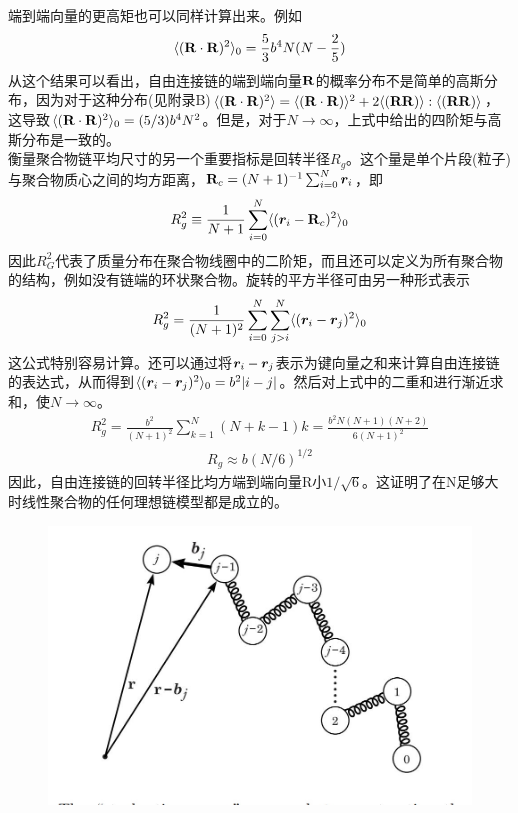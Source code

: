端到端向量的更高矩也可以同样计算出来。例如\\
\begin{gather}
\langle (\mathbf{R} \cdot \mathbf{R})^2 \rangle_{0}=\frac{5}{3}b^4N(N-\frac{2}{5})
\label{2.13}
\end{gather}
从这个结果可以看出，自由连接链的端到端向量$\mathbf{R}$的概率分布不是简单的高斯分布，因为对于这种分布(见附录B)$\langle (\mathbf{R} \cdot \mathbf{R})^2 \rangle=\langle (\mathbf{R} \cdot \mathbf{R}) \rangle^2+2\langle (\mathbf{R} \mathbf{R})\rangle:\langle (\mathbf{R} \mathbf{R})\rangle$，这导致$\langle (\mathbf{R} \cdot \mathbf{R})^2 \rangle_{0}=(5/3)b^4N^2$。但是，对于$N\rightarrow \infty$，上式中给出的四阶矩与高斯分布是一致的。\\

衡量聚合物链平均尺寸的另一个重要指标是回转半径$R_{g}$。这个量是单个片段(粒子)与聚合物质心之间的均方距离，$\mathbf{R}_{c}=(N+1)^{-1} \sum _{i=0}^{N} \bm{r}_{i}$，即\\
\begin{gather}
R_{g}^2 \equiv \frac{1}{N+1} \sum _{i=0}^{N} \langle (\bm{r}_{i}- \mathbf{R}_{c})^2 \rangle_{0} 
\label{2.14}
\end{gather}
因此$R_{G}^2$代表了质量分布在聚合物线圈中的二阶矩，而且还可以定义为所有聚合物的结构，例如没有链端的环状聚合物。旋转的平方半径可由另一种形式表示\\
\begin{gather}
R_{g}^2=\frac{1}{(N+1)^2} \sum _{i=0}^{N} \sum _{j>i}^{N} \langle (\bm{r}_{i}- \bm{r}_{j})^2 \rangle_{0} 
\label{2.15}
\end{gather}
这公式特别容易计算。还可以通过将$\bm{r}_{i}-\bm{r}_{j}$表示为键向量之和来计算自由连接链的表达式，从而得到$\langle (\bm{r}_{i}- \bm{r}_{j})^2 \rangle_{0}=b^2 |i-j|$。然后对上式中的二重和进行渐近求和，使$N \rightarrow \infty $。\\
\begin{gather}
R_{g}^{2} = \frac{b^2}{(N+1)^2} \sum _{k=1} ^{N} (N+k-1)k=\frac{b^2 N(N+1)(N+2)}{6(N+1)^2}
\end{gather}
\begin{gather}
R_{g}\approx b(N/6)^{1/2}
\label{2.16}
\end{gather}
因此，自由连接链的回转半径比均方端到端向量R小$1/\sqrt{6}$。这证明了在N足够大时线性聚合物的任何理想链模型都是成立的。\\
\begin{figure}[H]
	\centering   
	\includegraphics[width=12cm]{./figures/3.png}
	\caption{ }
	\label{2.2}
\end{figure}
